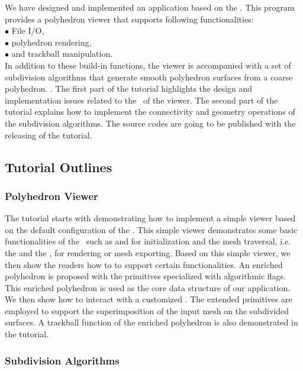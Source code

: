 \documentclass[letter,twocolumn]{article}
\begin{document}
We have designed and implemented an application based on the
\cgalpoly. This program provides a polyhedron viewer that supports
following functionalities:\\
\indent $\bullet$ File I/O,\\
\indent $\bullet$ polyhedron rendering,\\ 
\indent $\bullet$ and trackball manipulation.\\
In addition to these build-in functions, the viewer is accompanied
with a set of subdivision algorithms that generate smooth polyhedron
surfaces from a coarse polyhedron. . The first part of the tutorial
highlights the design and implementation issues related to the \poly\
of the viewer. The second part of the tutorial explains how to
implement the connectivity and geometry operations of the subdivision
algorithms. The source codes are going to be published with the
releasing of the tutorial.

\subsection*{Tutorial Outlines}
\subsubsection*{Polyhedron Viewer}

The tutorial starts with demonstrating how to implement a simple
viewer based on the default configuration of the \cgalpoly . This
simple viewer demonstrates some basic functionalities of the
\cgalpoly\ such as  and  
for initialization and the mesh traversal, i.e. the \italic{iterators}
and the \italic{circulators}, for rendering or mesh exporting. Based on
this simple viewer, we then show the readers how to
 to support certain functionalities. 
An enriched polyhedron is proposed with the primitives specialized
with algorithmic flags. This enriched polyhedron is used as the core
data structure of our application.  We then show how to interact with
a customized \poly.  The extended primitives are employed to support
the superimposition of the input mesh on the subdivided surfaces. A
trackball function of the enriched polyhedron is also demonstrated in
the tutorial.

\subsubsection*{Subdivision Algorithms}
\end{document}
